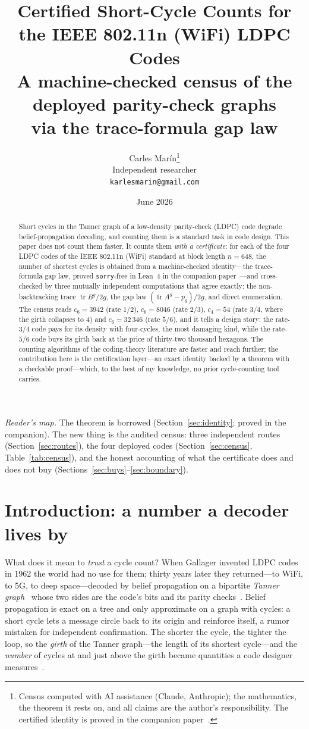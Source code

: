 \documentclass[11pt]{article}
\title{\bf Certified Short-Cycle Counts for the IEEE 802.11n (WiFi) LDPC Codes\\[4pt]
  \large\normalfont A machine-checked census of the deployed parity-check graphs\\
  via the trace-formula gap law}
\author{Carles Mar\'in\thanks{Census computed with AI assistance (Claude, Anthropic); the
mathematics, the theorem it rests on, and all claims are the author's responsibility. The
certified identity is proved in the companion paper~\cite{MarinGapWindow2026}.}\\[3pt]
  \normalsize Independent researcher\\
  \normalsize \texttt{karlesmarin@gmail.com}}
\date{June 2026}
\newcommand{\lean}[1]{\texttt{#1}}
\DeclareMathOperator{\tr}{tr}
\begin{document}
\maketitle

\begin{abstract}
Short cycles in the Tanner graph of a low-density parity-check (LDPC) code degrade
belief-propagation decoding, and counting them is a standard task in code design. This paper
does not count them faster. It counts them \emph{with a certificate}: for each of the four
LDPC codes of the IEEE 802.11n (WiFi) standard at block length $n = 648$, the number of
shortest cycles is obtained from a machine-checked identity---the trace-formula gap law,
proved \lean{sorry}-free in Lean~4 in the companion paper~\cite{MarinGapWindow2026}---and
cross-checked by three mutually independent computations that agree exactly: the
non-backtracking trace $\tr B^g/2g$, the gap law $(\tr A^g - p_g)/2g$, and direct
enumeration. The census reads $c_6 = 3942$ (rate $1/2$), $c_6 = 8046$ (rate $2/3$),
$c_4 = 54$ (rate $3/4$, where the girth collapses to $4$) and $c_6 = 32\,346$ (rate $5/6$),
and it tells a design story: the rate-$3/4$ code pays for its density with four-cycles, the
most damaging kind, while the rate-$5/6$ code buys its girth back at the price of thirty-two
thousand hexagons. The counting algorithms of the coding-theory literature are faster and
reach further; the contribution here is the certification layer---an exact identity backed
by a theorem with a checkable proof---which, to the best of my knowledge, no prior
cycle-counting tool carries.
\end{abstract}

\noindent\emph{Reader's map.} The theorem is borrowed (Section~\ref{sec:identity}; proved in
the companion). The new thing is the audited census: three independent routes
(Section~\ref{sec:routes}), the four deployed codes (Section~\ref{sec:census},
Table~\ref{tab:census}), and the honest accounting of what the certificate does and does not
buy (Sections~\ref{sec:buys}--\ref{sec:boundary}).

\section{Introduction: a number a decoder lives by}
\label{sec:intro}

What does it mean to \emph{trust} a cycle count? When Gallager invented LDPC codes in 1962
the world had no use for them; thirty years later they returned---to WiFi, to 5G, to deep
space---decoded by belief propagation on a bipartite \emph{Tanner graph}~\cite{Tanner1981}
whose two sides are the code's bits and its parity checks~\cite{Gallager1962,MacKay1999}.
Belief propagation is exact on a tree and only approximate on a graph with cycles: a short
cycle lets a message circle back to its origin and reinforce itself, a rumor mistaken for
independent confirmation. The shorter the cycle, the tighter the loop, so the \emph{girth}
of the Tanner graph---the length of its shortest cycle---and the \emph{number} of cycles at
and just above the girth became quantities a code designer measures~\cite{Tanner1981,
KarimiBanihashemi2013}.
\end{document}
